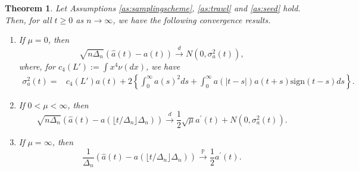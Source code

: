 \documentclass{article}
\theoremstyle{plain}
\newtheorem{theorem}{Theorem}
\theoremstyle{definition}
\theoremstyle{remark}
\begin{document}
\begin{theorem}\label{thmCLTtrawlapprox} Let Assumptions \ref{as:samplingscheme},
	\ref{as:trawl} and \ref{as:seed} hold. Then, for all $t\geq0$ as
	$n\rightarrow\infty$, we have the following convergence results.
	\begin{enumerate}
		\item If $\mu=0$, then 
		\[
		\sqrt{n\Delta_{n}}\left(\hat{a}(t)-a(t)\right)\overset{d}{\rightarrow}N(0,\sigma_{a}^{2}(t)),
		\]
		where, for $c_{4}(L'):=\int x^{4}\nu(dx)$, we have 
		\begin{align*}
			\sigma_{a}^{2}(t)= & c_{4}(L')a(t)+2\left\{ \int_{0}^{\infty}a(s)^{2}ds+\int_{0}^{\infty}a(\left|t-s\right|)a(t+s)\mathrm{sign}(t-s)ds\right\} .
		\end{align*}
		\item If $0<\mu<\infty$, then 
		\[
		\sqrt{n\Delta_{n}}\left(\hat{a}(t)-a( \lfloor  t/\Delta_{n}\rfloor\Delta_{n})\right)\overset{d}{\rightarrow}\frac{1}{2}\sqrt{\mu}a^{\prime}(t)+N(0,\sigma_{a}^{2}(t)).
		\]
		\item If $\mu=\infty$, then
		\[
		\frac{1}{\Delta_{n}}\left(\hat{a}(t)-a(\lfloor t/\Delta_{n}\rfloor\Delta_{n})\right)\overset{\mathbb{P}}{\rightarrow}\frac{1}{2}a^{\prime}(t).
		\]
	\end{enumerate}
\end{theorem}
\end{document}
